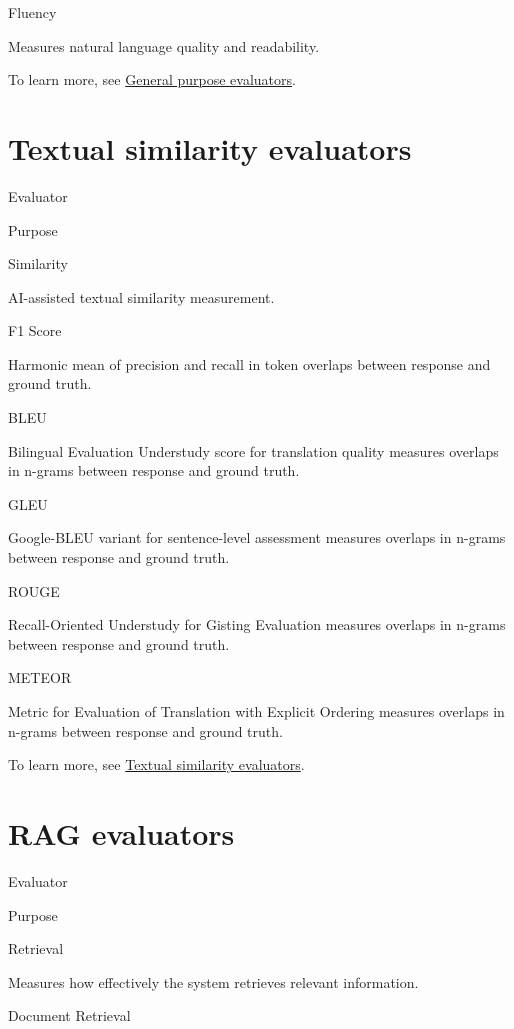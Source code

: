 \documentclass[
  letterpaper,
  DIV=11,
  numbers=noendperiod,
  oneside]{scrreprt}
\begin{document}
\begin{tcolorbox}
Fluency

Measures natural language quality and readability.

To learn more, see
\href{https://learn.microsoft.com/en-us/azure/foundry/concepts/evaluation-evaluators/general-purpose-evaluators}{General
purpose evaluators}.

\section{Textual similarity
evaluators}\label{textual-similarity-evaluators}

Evaluator

Purpose

Similarity

AI-assisted textual similarity measurement.

F1 Score

Harmonic mean of precision and recall in token overlaps between response
and ground truth.

BLEU

Bilingual Evaluation Understudy score for translation quality measures
overlaps in n-grams between response and ground truth.

GLEU

Google-BLEU variant for sentence-level assessment measures overlaps in
n-grams between response and ground truth.

ROUGE

Recall-Oriented Understudy for Gisting Evaluation measures overlaps in
n-grams between response and ground truth.

METEOR

Metric for Evaluation of Translation with Explicit Ordering measures
overlaps in n-grams between response and ground truth.

To learn more, see
\href{https://learn.microsoft.com/en-us/azure/foundry/concepts/evaluation-evaluators/textual-similarity-evaluators}{Textual
similarity evaluators}.

\section{RAG evaluators}\label{rag-evaluators}

Evaluator

Purpose

Retrieval

Measures how effectively the system retrieves relevant information.

Document Retrieval


\end{tcolorbox}
\end{document}
